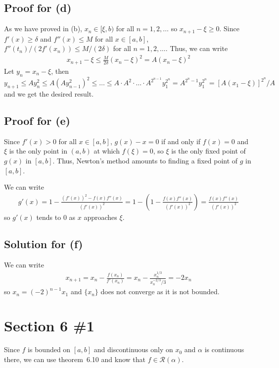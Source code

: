 \documentclass{scrartcl}
\begin{document}
\subsection{Proof for (d)}
As we have proved in (b), \(x_n \in [\xi, b)\) for all \(n = 1, 2, \dots\) so \(x_{n + 1} - \xi \geq 0\).
Since \(f'(x) \geq \delta\) and \(f''(x) \leq M\) for all \(x \in [a, b]\), \(f''(t_n) / (2f'(x_n)) \leq M / (2\delta)\) for all \(n = 1, 2, \dots\).
Thus, we can write
\begin{align*}
  x_{n + 1} - \xi \leq \frac{M}{2\delta} (x_n - \xi)^2 = A(x_n - \xi)^2
\end{align*}
Let \(y_n = x_n - \xi\), then \(y_{n + 1} \leq Ay_n^2 \leq A(Ay_{n - 1}^2)^2 \leq \dots \leq A \cdot A^2 \cdot \dots \cdot A^{2^{n - 1}} y_1^{2^n} = A^{2^n - 1} y_1^{2^n} = [A(x_1 - \xi)]^{2^n} / A\) and we get the desired result.

\subsection{Proof for (e)}
Since \(f'(x) > 0\) for all \(x \in [a, b]\), \(g(x) - x = 0\) if and only if \(f(x) = 0\) and \(\xi\) is the only point in \((a, b)\) at which \(f(\xi) = 0\), so \(\xi\) is the only fixed point of \(g(x)\) in \([a, b]\).
Thus, Newton's method amounts to finding a fixed point of \(g\) in \([a, b]\).

We can write
\begin{align*}
  g'(x) = 1 - \frac{(f'(x))^2 - f(x) f''(x)}{(f'(x))^2} = 1 - \left( 1 - \frac{f(x) f''(x)}{(f'(x))^2} \right) = \frac{f(x) f''(x)}{(f'(x))^2}
\end{align*}
so \(g'(x)\) tends to 0 as \(x\) approaches \(\xi\).

\subsection{Solution for (f)}
We can write
\begin{align*}
  x_{n + 1} = x_n - \frac{f(x_n)}{f'(x_n)} = x_n - \frac{x_n^{1/3}}{x_n^{-2/3}/3} = -2x_n
\end{align*}
so \(x_n = (-2)^{n - 1} x_1\) and \(\{x_n\}\) does not converge as it is not bounded.

\section{Section 6 \#1}
Since \(f\) is bounded on \([a, b]\) and discontinuous only on \(x_0\) and \(\alpha\) is continuous there, we can use theorem~6.10 and know that \(f \in \mathscr{R}(\alpha)\).
\end{document}
